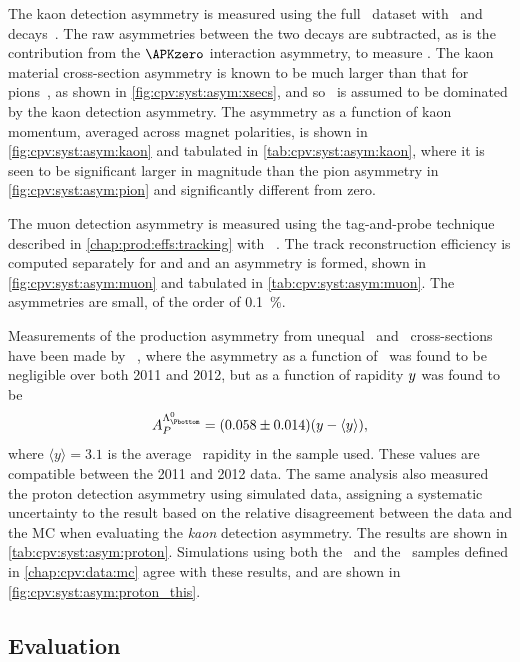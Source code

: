 The kaon detection asymmetry is measured using the full \runone\ dataset with 
\DpToKpipi\ and \decay{\PDplus}{\APKzero\Ppiplus} decays~\cite{Aaij:2014gsa}.
The raw asymmetries between the two decays are subtracted, as is the 
contribution from the $\APKzero$ interaction asymmetry, to measure \ADKpi.
The kaon material cross-section asymmetry is known to be much larger than that 
for pions~\cite{PDG2014}, as shown in \cref{fig:cpv:syst:asym:xsecs}, and so 
\ADKpi\ is assumed to be dominated by the kaon detection asymmetry.
The asymmetry as a function of kaon momentum, averaged across magnet 
polarities, is shown in \cref{fig:cpv:syst:asym:kaon} and tabulated in 
\cref{tab:cpv:syst:asym:kaon}, where it is seen to be significant larger in 
magnitude than the pion asymmetry in \cref{fig:cpv:syst:asym:pion} and 
significantly different from zero.

The muon detection asymmetry is measured using the tag-and-probe technique described in \cref{chap:prod:effs:tracking} with \JpsiTomumu~\cite{Stahl:2010261}.
The track reconstruction efficiency is computed separately for \Pmuon and \APmuon and an asymmetry is formed, shown in \cref{fig:cpv:syst:asym:muon} and tabulated in \cref{tab:cpv:syst:asym:muon}.
The asymmetries are small, of the order of \SI{0.1}{\percent}.

Measurements of the production asymmetry from unequal \PLambdab\ and 
\APLambdab\ cross-sections have been made by \lhcb~\cite{Aaij:2015fea}, where 
the asymmetry as a function of \pT\ was found to be negligible over both 2011 
and 2012, but as a function of rapidity $y$ was found to be
\begin{equation}
  \APLb = (0.058 \pm 0.014)(y - \langle{y}\rangle),
\end{equation}
where $\langle{y}\rangle = 3.1$ is the average \PLambdab\ rapidity in the 
sample used.
These values are compatible between the 2011 and 2012 data.
The same analysis also measured the proton detection asymmetry using simulated 
data, assigning a systematic uncertainty to the result based on the relative 
disagreement between the data and the \ac{MC} when evaluating the \emph{kaon} 
detection asymmetry.
The results are shown in \cref{tab:cpv:syst:asym:proton}.
Simulations using both the \pKK\ and the \ppipi\ samples defined in 
\cref{chap:cpv:data:mc} agree with these results, and are shown in 
\cref{fig:cpv:syst:asym:proton_this}.

\subsection{Evaluation}
\label{chap:cpv:syst:asym:eval}

